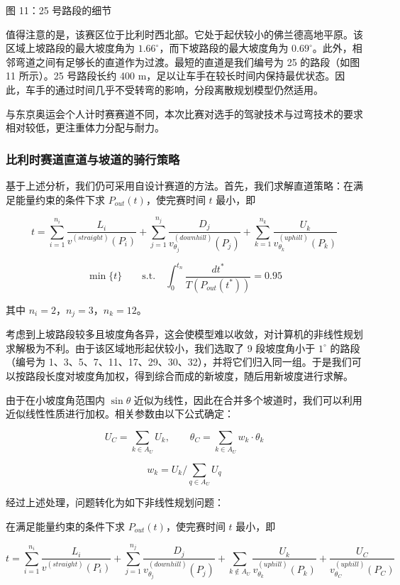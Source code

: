 \documentclass[11pt,a4paper]{ctexart}
\begin{document}
图 11：25 号路段的细节

值得注意的是，该赛区位于比利时西北部。它处于起伏较小的佛兰德高地平原。该区域上坡路段的最大坡度角为 $1.66^{\circ}$，而下坡路段的最大坡度角为 $0.69^{\circ}$。此外，相邻弯道之间有足够长的直道作为过渡。最短的直道是我们编号为 25 的路段（如图 11 所示）。25 号路段长约 400 m，足以让车手在较长时间内保持最优状态。因此，车手的通过时间几乎不受转弯的影响，分段离散规划模型仍然适用。

与东京奥运会个人计时赛赛道不同，本次比赛对选手的驾驶技术与过弯技术的要求相对较低，更注重体力分配与耐力。

\subsubsection{比利时赛道直道与坡道的骑行策略}

基于上述分析，我们仍可采用自设计赛道的方法。首先，我们求解直道策略：在满足能量约束的条件下求 $P_{out}(t)$，使完赛时间 $t$ 最小，即

\[
t=\sum_{i=1}^{n_i}\frac{L_i}{v^{(straight)}(P_i)}+\sum_{j=1}^{n_j}\frac{D_j}{v^{(downhill)}_{\theta_j}(P_j)}+\sum_{k=1}^{n_k}\frac{U_k}{v^{(uphill)}_{\theta_k}(P_k)}
\]

\[
\min\{t\}\qquad\mathrm{s.t.}\quad\int_0^{t_n}\frac{dt^{\ast}}{T\left(P_{out}(t^{\ast})\right)}=0.95
\]

其中 $n_i=2$，$n_j=3$，$n_k=12$。

考虑到上坡路段较多且坡度角各异，这会使模型难以收敛，对计算机的非线性规划求解极为不利。由于该区域地形起伏较小，我们选取了 9 段坡度角小于 $1^{\circ}$ 的路段（编号为 1、3、5、7、11、17、29、30、32），并将它们归入同一组。于是我们可以按路段长度对坡度角加权，得到综合而成的新坡度，随后用新坡度进行求解。

由于在小坡度角范围内 $\sin\theta$ 近似为线性，因此在合并多个坡道时，我们可以利用近似线性性质进行加权。相关参数由以下公式确定：

\[
U_C=\sum_{k\in A_U}U_k,\qquad \theta_C=\sum_{k\in A_U}w_k\cdot\theta_k
\]

\[
w_k=U_k\Big/\sum_{q\in A_U}U_q
\]

经过上述处理，问题转化为如下非线性规划问题：

在满足能量约束的条件下求 $P_{out}(t)$，使完赛时间 $t$ 最小，即

\[
t=\sum_{i=1}^{n_i}\frac{L_i}{v^{(straight)}(P_i)}+\sum_{j=1}^{n_j}\frac{D_j}{v^{(downhill)}_{\theta_j}(P_j)}+\sum_{k\notin A_U}\frac{U_k}{v^{(uphill)}_{\theta_k}(P_k)}+\frac{U_C}{v^{(uphill)}_{\theta_C}(P_C)}
\]
\end{document}
